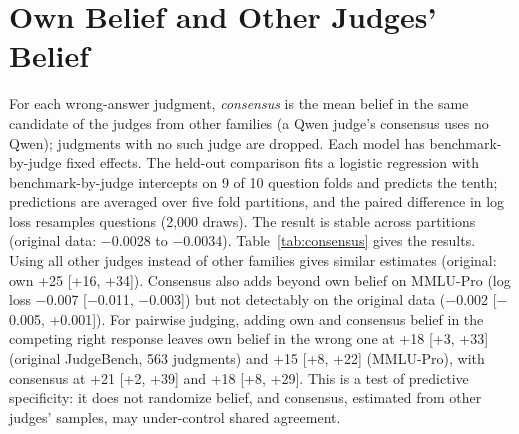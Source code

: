 \documentclass[11pt]{article}
\begin{document}
\section{Own Belief and Other Judges' Belief}
\label{app:consensus}

For each wrong-answer judgment, \emph{consensus} is the mean belief in the same candidate of the judges from other
families (a Qwen judge's consensus uses no Qwen); judgments with no such judge are dropped. Each model has
benchmark-by-judge fixed effects. The held-out comparison fits a logistic regression with benchmark-by-judge
intercepts on 9 of 10 question folds and predicts the tenth; predictions are averaged over five fold partitions, and
the paired difference in log loss resamples questions (2,000 draws). The result is stable across partitions (original
data: $-$0.0028 to $-$0.0034). Table~\ref{tab:consensus} gives the results. Using all other judges instead of other
families gives similar estimates (original: own +25 [+16, +34]). Consensus also adds beyond own belief on MMLU-Pro
(log loss $-$0.007 [$-$0.011, $-$0.003]) but not detectably on the original data ($-$0.002 [$-$0.005, +0.001]). For
pairwise judging, adding own and consensus belief in the competing right response leaves own belief in the wrong one
at +18 [+3, +33] (original JudgeBench, 563 judgments) and +15 [+8, +22] (MMLU-Pro), with consensus at +21 [+2, +39]
and +18 [+8, +29]. This is a test of predictive specificity: it does not randomize belief, and consensus, estimated
from other judges' samples, may under-control shared agreement.
\end{document}
